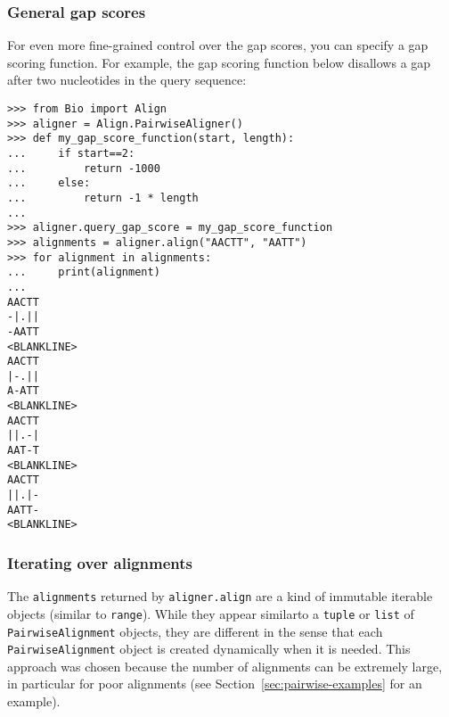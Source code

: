 \subsubsection{General gap scores}
\label{sec:pairwise-general-gapscores}

For even more fine-grained control over the gap scores, you can specify a gap scoring function. For example, the gap scoring function below disallows a gap after two nucleotides in the query sequence:

\begin{verbatim}
>>> from Bio import Align
>>> aligner = Align.PairwiseAligner()
>>> def my_gap_score_function(start, length):
...     if start==2:
...         return -1000
...     else:
...         return -1 * length
...
>>> aligner.query_gap_score = my_gap_score_function
>>> alignments = aligner.align("AACTT", "AATT")
>>> for alignment in alignments:
...     print(alignment)
... 
AACTT
-|.||
-AATT
<BLANKLINE>
AACTT
|-.||
A-ATT
<BLANKLINE>
AACTT
||.-|
AAT-T
<BLANKLINE>
AACTT
||.|-
AATT-
<BLANKLINE>
\end{verbatim}

\subsubsection{Iterating over alignments}

The \verb+alignments+ returned by \verb+aligner.align+ are a kind of immutable iterable objects (similar to \verb+range+). While they appear similarto a \verb+tuple+ or \verb+list+ of \verb+PairwiseAlignment+ objects, they are different in the sense that each \verb+PairwiseAlignment+ object is created dynamically when it is needed. This approach was chosen because the number of alignments can be extremely large, in particular for poor alignments (see Section~\ref{sec:pairwise-examples} for an example).


